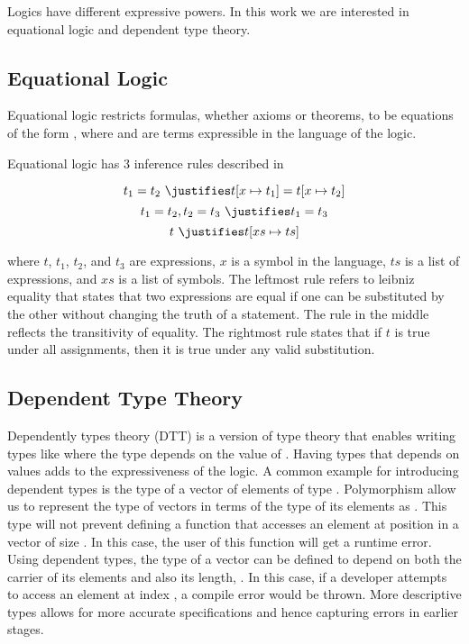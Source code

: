 Logics have different expressive powers. In this work we are interested in equational logic and dependent type theory. 
\subsection{Equational Logic}
Equational logic restricts formulas, whether axioms or theorems, to be equations of the form , where  and   are terms expressible in the language of the logic. 

Equational logic has $3$ inference rules described in~\cite{Gries1993EquationalLogic} 
\begin{proofrules}
        \[ t_1 = t_2 \ \justifies t[x \mapsto t_1] = t[x \mapsto t_2] \]
        \[ t_1 = t_2 , t_2 = t_3 \ \justifies t_1 = t_3 \]
        \[t \ \justifies t [xs \mapsto ts] \] 
\end{proofrules}       
where $t$, $t_1$, $t_2$, and $t_3$ are expressions, $x$ is a symbol in the language, $ts$ is a list of expressions, and $xs$ is a list of symbols. 
The leftmost rule refers to leibniz equality that states that two expressions are equal if one can be substituted by the other without changing the truth of a statement. 
The rule in the middle reflects the transitivity of equality. 
The rightmost rule states that if $t$ is true under all assignments, then it is true under any valid substitution.  

\subsection{Dependent Type Theory}
\label{subsec:background:dtt}
Dependently types theory (DTT) is a version of type theory that enables writing types like  where the type  depends on the value of . 
Having types that depends on values adds to the expressiveness of the logic. A common example for introducing dependent types is the type of a vector of  elements of type . Polymorphism allow us to represent the type of vectors in terms of the type of its elements as . This type will not prevent defining a function that accesses an element at position  in a vector of size . In this case, the user of this function will get a runtime error. Using dependent types, the type of a vector can be defined to depend on both the carrier of its elements and also its length, . In this case, if a developer attempts to access an element at index , a compile error would be thrown. More descriptive types allows for more accurate specifications and hence capturing errors in earlier stages. 


